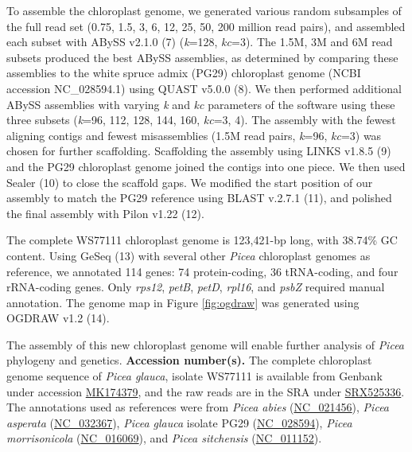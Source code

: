 \documentclass[titlepage,11pt, oneside]{article}   	%
\begin{document}
To assemble the chloroplast genome, we generated various random subsamples of the full read set (0.75, 1.5, 3, 6, 12, 25, 50, 200 million read pairs), and assembled each subset with ABySS v2.1.0 (7) (\textit{k}=128, \textit{kc}=3). The 1.5M, 3M and 6M read subsets produced the best ABySS assemblies, as determined by comparing these assemblies to the white spruce admix (PG29) chloroplast genome (NCBI accession NC\_028594.1) using QUAST v5.0.0 (8). We then performed additional ABySS assemblies with varying \textit{k} and \textit{kc} parameters of the software using these three subsets (\textit{k}=96, 112, 128, 144, 160, \textit{kc}=3, 4). The assembly with the fewest aligning contigs and fewest misassemblies (1.5M read pairs, \textit{k}=96, \textit{kc}=3) was chosen for further scaffolding. Scaffolding the assembly using LINKS v1.8.5 (9) and the PG29 chloroplast genome joined the contigs into one piece. We then used Sealer (10) to close the scaffold gaps. We modified the start position of our assembly to match the PG29 reference using BLAST v.2.7.1 (11), and polished the final assembly with Pilon v1.22 (12).
\newline
\par
The complete WS77111 chloroplast genome is 123,421-bp long, with 38.74\% GC content. Using GeSeq (13) with several other \textit{Picea} chloroplast genomes as reference, we annotated 114 genes: 74 protein-coding, 36 tRNA-coding, and four rRNA-coding genes. Only \textit{rps12}, \textit{petB}, \textit{petD}, \textit{rpl16}, and \textit{psbZ} required manual annotation. The genome map in Figure \ref{fig:ogdraw} was generated using OGDRAW v1.2 (14). 
\newline
\par
The assembly of this new chloroplast genome will enable further analysis of \textit{Picea} phylogeny and genetics.
\newline
\newline
\textbf{Accession number(s).} The complete chloroplast genome sequence of \textit{Picea glauca}, isolate WS77111 is available from Genbank under accession \href{https://www.ncbi.nlm.nih.gov/nuccore/MK174379}{MK174379}, and the raw reads are in the SRA under \href{https://www.ncbi.nlm.nih.gov/sra/SRX525336}{SRX525336}. The annotations used as references were from \textit{Picea abies} (\href{https://www.ncbi.nlm.nih.gov/nuccore/NC_021456}{NC\_021456}), \textit{Picea asperata} (\href{https://www.ncbi.nlm.nih.gov/nuccore/NC_032367}{NC\_032367}), \textit{Picea glauca} isolate PG29 (\href{https://www.ncbi.nlm.nih.gov/nuccore/NC_028594}{NC\_028594}), \textit{Picea morrisonicola} (\href{https://www.ncbi.nlm.nih.gov/nuccore/NC_016069}{NC\_016069}), and \textit{Picea sitchensis }(\href{https://www.ncbi.nlm.nih.gov/nuccore/NC_011152}{NC\_011152}).
\end{document}
